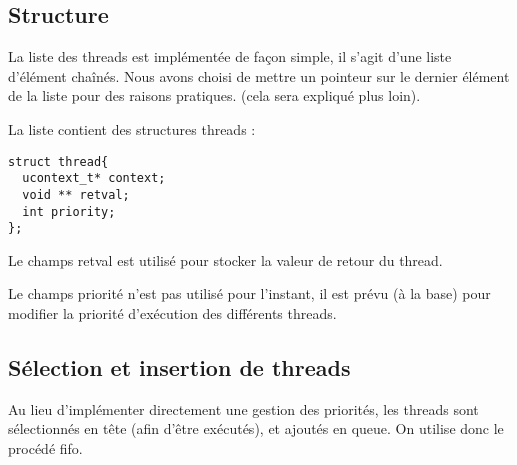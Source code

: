 \subsection*{Structure}
La liste des threads est implémentée de façon simple, il s'agit d'une liste d'élément chaînés. Nous avons choisi de mettre un pointeur sur le dernier élément de la liste pour des raisons pratiques. (cela sera expliqué plus loin).

La liste contient des structures threads :
\begin{verbatim}
struct thread{
  ucontext_t* context;
  void ** retval;
  int priority;
};
\end{verbatim}
Le champs retval est utilisé pour stocker la valeur de retour du thread.

Le champs priorité n'est pas utilisé pour l'instant, il est prévu (à la base) pour modifier la priorité d'exécution des différents threads.

\subsection*{Sélection et insertion de threads}
Au lieu d'implémenter directement une gestion des priorités, les threads sont sélectionnés en tête (afin d'être exécutés), et ajoutés en queue. On utilise donc le procédé fifo.
